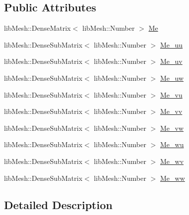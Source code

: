 \subsection*{Public Attributes}
\begin{DoxyCompactItemize}
\item 
lib\+Mesh\+::\+Dense\+Matrix$<$ lib\+Mesh\+::\+Number $>$ \hyperlink{classcarl_1_1coupling__matrices__3_a8168867299d675801de227565e969280}{Me}
\item 
lib\+Mesh\+::\+Dense\+Sub\+Matrix$<$ lib\+Mesh\+::\+Number $>$ \hyperlink{classcarl_1_1coupling__matrices__3_a9038b3af932d8a3cbca3662c6a071ff6}{Me\+\_\+uu}
\item 
lib\+Mesh\+::\+Dense\+Sub\+Matrix$<$ lib\+Mesh\+::\+Number $>$ \hyperlink{classcarl_1_1coupling__matrices__3_a4ce35a3abfdcfa68633df7a7f1f685e0}{Me\+\_\+uv}
\item 
lib\+Mesh\+::\+Dense\+Sub\+Matrix$<$ lib\+Mesh\+::\+Number $>$ \hyperlink{classcarl_1_1coupling__matrices__3_a11eb52d03c2c0520f87c75a89ed4d049}{Me\+\_\+uw}
\item 
lib\+Mesh\+::\+Dense\+Sub\+Matrix$<$ lib\+Mesh\+::\+Number $>$ \hyperlink{classcarl_1_1coupling__matrices__3_a7f606b964255ab6db7df26647ca7676c}{Me\+\_\+vu}
\item 
lib\+Mesh\+::\+Dense\+Sub\+Matrix$<$ lib\+Mesh\+::\+Number $>$ \hyperlink{classcarl_1_1coupling__matrices__3_af53f357fe4ae7938cefda80a92900bef}{Me\+\_\+vv}
\item 
lib\+Mesh\+::\+Dense\+Sub\+Matrix$<$ lib\+Mesh\+::\+Number $>$ \hyperlink{classcarl_1_1coupling__matrices__3_a384c93a0e2bfe69a4b908b333e226113}{Me\+\_\+vw}
\item 
lib\+Mesh\+::\+Dense\+Sub\+Matrix$<$ lib\+Mesh\+::\+Number $>$ \hyperlink{classcarl_1_1coupling__matrices__3_a3f3132dbd7587e504d12c047c598bc52}{Me\+\_\+wu}
\item 
lib\+Mesh\+::\+Dense\+Sub\+Matrix$<$ lib\+Mesh\+::\+Number $>$ \hyperlink{classcarl_1_1coupling__matrices__3_a34a3d938e7ad54997b5d8a227614f983}{Me\+\_\+wv}
\item 
lib\+Mesh\+::\+Dense\+Sub\+Matrix$<$ lib\+Mesh\+::\+Number $>$ \hyperlink{classcarl_1_1coupling__matrices__3_a9b360e5c33276d238262dfe40aaa4aeb}{Me\+\_\+ww}
\end{DoxyCompactItemize}


\subsection{Detailed Description}


